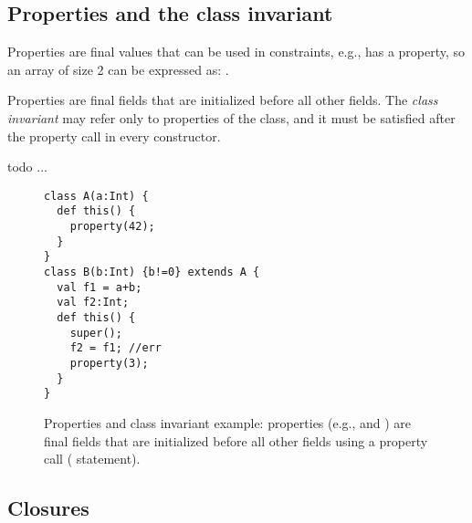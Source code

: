 \subsection{Properties and the class invariant}
Properties are final values that can be used in constraints,
    e.g.,  has a  property,
    so an array of size 2 can be expressed as: .

Properties are final fields that are initialized before all other fields.
The \emph{class invariant} may refer only to properties of the class,
    and it must be satisfied after the property call in every constructor.


 todo ...

\begin{figure}
\begin{lstlisting}
class A(a:Int) {
  def this() {
    property(42);
  }
}
class B(b:Int) {b!=0} extends A {
  val f1 = a+b;
  val f2:Int;
  def this() {
    super();
    f2 = f1; //err
    property(3);
  }
}
\end{lstlisting}
\caption{Properties and class invariant example:
        properties (e.g.,  and )
        are final fields that are initialized before all other fields
        using a property call ( statement).
    }
\label{Figure:Properties}
\end{figure}




\subsection{Closures}



